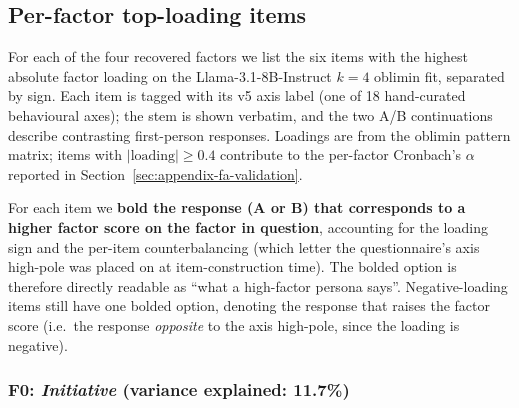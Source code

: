 \subsection{Per-factor top-loading items}\label{sec:appendix-fa-factor-items}

For each of the four recovered factors we list the six items with the highest absolute factor loading on the Llama-3.1-8B-Instruct $k=4$ oblimin fit, separated by sign. Each item is tagged with its v5 axis label (one of 18 hand-curated behavioural axes); the stem is shown verbatim, and the two A/B continuations describe contrasting first-person responses. Loadings are from the oblimin pattern matrix; items with $|\text{loading}| \geq 0.4$ contribute to the per-factor Cronbach's $\alpha$ reported in Section~\ref{sec:appendix-fa-validation}.

For each item we \textbf{bold the response (A or B) that corresponds to a higher factor score on the factor in question}, accounting for the loading sign and the per-item counterbalancing (which letter the questionnaire's axis high-pole was placed on at item-construction time). The bolded option is therefore directly readable as ``what a high-factor persona says''. Negative-loading items still have one bolded option, denoting the response that raises the factor score (i.e.\ the response \emph{opposite} to the axis high-pole, since the loading is negative).


\subsubsection{F0: \textit{Initiative} (variance explained: 11.7\%)}

